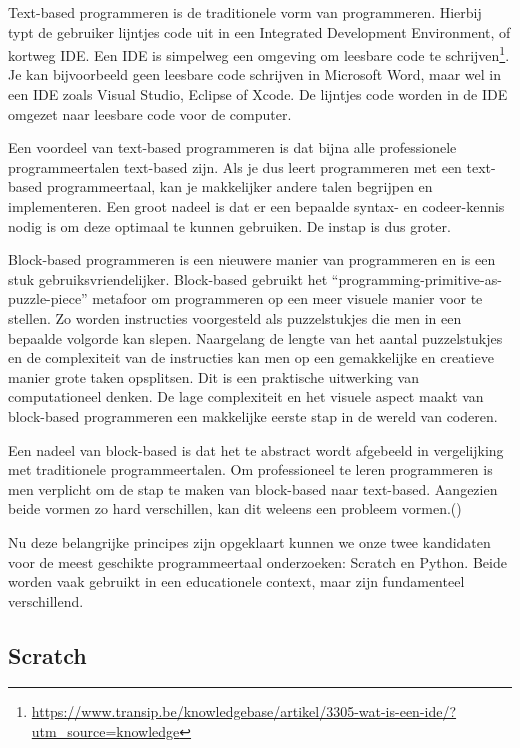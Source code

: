 Text-based programmeren is de traditionele vorm van programmeren. Hierbij typt de gebruiker lijntjes code uit in een Integrated Development Environment, of kortweg IDE. Een IDE is simpelweg een omgeving om leesbare code te schrijven\footnote{\url{https://www.transip.be/knowledgebase/artikel/3305-wat-is-een-ide/?utm_source=knowledge}}. Je kan bijvoorbeeld geen leesbare code schrijven in Microsoft Word, maar wel in een IDE zoals Visual Studio, Eclipse of Xcode. De lijntjes code worden in de IDE omgezet naar leesbare code voor de computer.

Een voordeel van text-based programmeren is dat bijna alle professionele programmeertalen text-based zijn. Als je dus leert programmeren met een text-based programmeertaal, kan je makkelijker andere talen begrijpen en implementeren. Een groot nadeel is dat er een bepaalde syntax- en codeer-kennis nodig is om deze optimaal te kunnen gebruiken. De instap is dus groter. 

Block-based programmeren is een nieuwere manier van programmeren en is een stuk gebruiksvriendelijker. Block-based gebruikt het “programming-primitive-as-puzzle-piece” metafoor om programmeren op een meer visuele manier voor te stellen. Zo worden instructies voorgesteld als puzzelstukjes die men in een bepaalde volgorde kan slepen. Naargelang de lengte van het aantal puzzelstukjes en de complexiteit van de instructies kan men op een gemakkelijke en creatieve manier grote taken opsplitsen. Dit is een praktische uitwerking van computationeel denken. De lage complexiteit en het visuele aspect maakt van block-based programmeren een makkelijke eerste stap in de wereld van coderen. 

Een nadeel van block-based is dat het te abstract wordt afgebeeld in vergelijking met traditionele programmeertalen. Om professioneel te leren programmeren is men verplicht om de stap te maken van block-based naar text-based. Aangezien beide vormen zo hard verschillen, kan dit weleens een probleem vormen.(\cite{Weintrop2019,Maloney2010})

Nu deze belangrijke principes zijn opgeklaart kunnen we onze twee kandidaten voor de meest geschikte programmeertaal onderzoeken: Scratch en Python. Beide worden vaak gebruikt in een educationele context, maar zijn fundamenteel verschillend. 

\subsection{Scratch}

